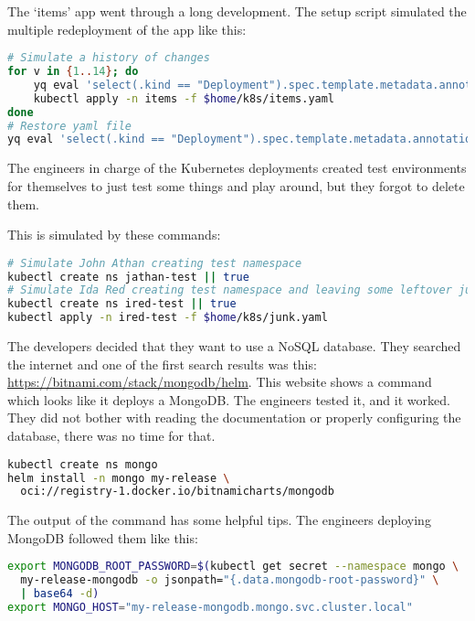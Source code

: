 The `items' app went through a long development. The setup script simulated the multiple redeployment of the app like this:

\begin{lstlisting}[caption={Create first deployment},language=bash,label=code:bash4]
# Simulate a history of changes
for v in {1..14}; do
    yq eval 'select(.kind == "Deployment").spec.template.metadata.annotations.v = env(v)' $home/k8s/items.yaml -i
    kubectl apply -n items -f $home/k8s/items.yaml
done
# Restore yaml file
yq eval 'select(.kind == "Deployment").spec.template.metadata.annotations.v = "0"' $home/k8s/items.yaml -i
\end{lstlisting}

The engineers in charge of the Kubernetes deployments created test environments for themselves to just test some things and play around, but they forgot to delete them.

This is simulated by these commands:

\begin{lstlisting}[caption={Create first deployment},language=bash,label=code:bash5]
# Simulate John Athan creating test namespace
kubectl create ns jathan-test || true
# Simulate Ida Red creating test namespace and leaving some leftover junk in it
kubectl create ns ired-test || true
kubectl apply -n ired-test -f $home/k8s/junk.yaml
\end{lstlisting}

The developers decided that they want to use a NoSQL database. They searched the internet and one of the first search results was this: \url{https://bitnami.com/stack/mongodb/helm}. This website shows a command which looks like it deploys a MongoDB. The engineers tested it, and it worked. They did not bother with reading the documentation or properly configuring the database, there was no time for that.

\begin{lstlisting}[caption={Create first deployment},language=bash,label=code:bash5]
kubectl create ns mongo
helm install -n mongo my-release \
  oci://registry-1.docker.io/bitnamicharts/mongodb
\end{lstlisting}

The output of the command has some helpful tips. The engineers deploying MongoDB followed them like this:

\begin{lstlisting}[caption={Create first deployment},language=bash,label=code:bash6]
export MONGODB_ROOT_PASSWORD=$(kubectl get secret --namespace mongo \
  my-release-mongodb -o jsonpath="{.data.mongodb-root-password}" \
  | base64 -d)
export MONGO_HOST="my-release-mongodb.mongo.svc.cluster.local"
\end{lstlisting}

